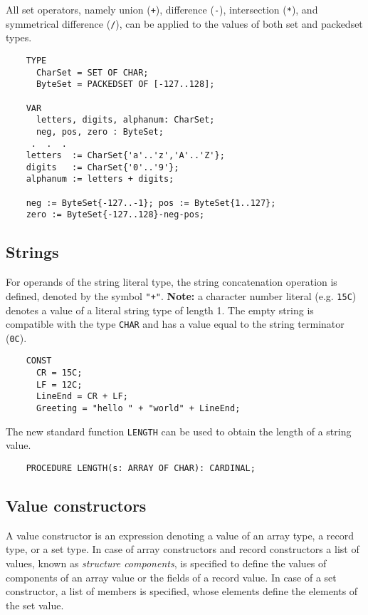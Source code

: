 All set operators, namely union (\verb|+|), difference (\verb|-|),
intersection (\verb|*|), and symmetrical difference (\verb|/|), can
be applied to the values of both set and packedset types.

\begin{verbatim}
    TYPE
      CharSet = SET OF CHAR;
      ByteSet = PACKEDSET OF [-127..128];

    VAR
      letters, digits, alphanum: CharSet;
      neg, pos, zero : ByteSet;
     .  .  .
    letters  := CharSet{'a'..'z','A'..'Z'};
    digits   := CharSet{'0'..'9'};
    alphanum := letters + digits;

    neg := ByteSet{-127..-1}; pos := ByteSet{1..127};
    zero := ByteSet{-127..128}-neg-pos;
\end{verbatim}

\subsection{Strings}\label{m2:ISO:strings}

For operands of the string literal type, the string concatenation
operation is defined, denoted by the symbol \verb|"+"|. {\bf Note:}
a character number literal (e.g. \verb'15C') denotes a value of a literal
string type of length 1. The empty string is compatible with the
type \verb'CHAR' and has a value equal to the string terminator (\verb'0C').

\begin{verbatim}
    CONST
      CR = 15C;
      LF = 12C;
      LineEnd = CR + LF;
      Greeting = "hello " + "world" + LineEnd;
\end{verbatim}

The new standard function \verb'LENGTH' can be used to obtain the length
of a string value.

\verb'    PROCEDURE LENGTH(s: ARRAY OF CHAR): CARDINAL;'

\subsection{Value constructors}\label{m2:ISO:aggregates}

A value constructor is an expression denoting a value of an array
type, a record type, or a set type. In case of array
constructors and record constructors a list of values, known as
{\em structure components}, is specified to define the values of
components of an array value or the fields of a record value.
In case of a set constructor, a list of members is specified,
whose elements define the elements of the set value.

